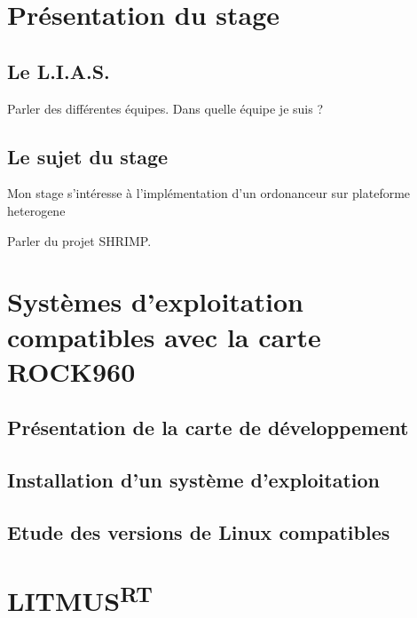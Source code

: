 \documentclass{article}
\newcommand{\litmus}{LITMUS\textsuperscript{RT}}
\begin{document}
    \section*{Présentation du stage}
    
    
    \subsection{Le L.I.A.S.}

    Parler des différentes équipes.
    Dans quelle équipe je suis ?
    \subsection{Le sujet du stage}
    
    Mon stage s'intéresse à l'implémentation d'un ordonanceur sur \gls{plateforme heterogene}\cite{bertout2020workload}

    Parler du projet SHRIMP. %

    \newpage
    \section[OS compatibles avec la carte]{Systèmes d'exploitation compatibles avec la carte ROCK960}
    \subsection{Présentation de la carte de développement}
    

    \subsection{Installation d'un système d'exploitation}
    

    \subsection{Etude des versions de Linux compatibles}
    

    


    
    \newpage
    \section{\litmus}
    
\end{document}
